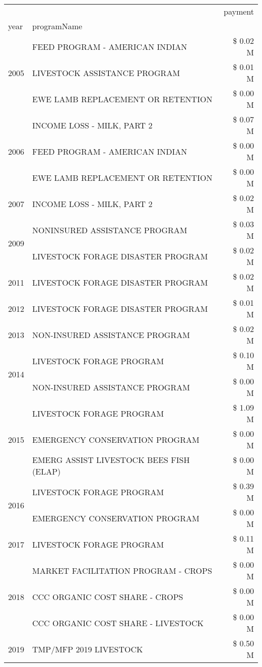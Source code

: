 \begin{tabular}{llr}
\toprule
 &  & payment \\
year & programName &  \\
\midrule
\multirow[t]{3}{*}{2005} & FEED PROGRAM - AMERICAN INDIAN & \$ 0.02 M \\
 & LIVESTOCK ASSISTANCE PROGRAM & \$ 0.01 M \\
 & EWE LAMB REPLACEMENT OR RETENTION & \$ 0.00 M \\
\cline{1-3}
\multirow[t]{3}{*}{2006} & INCOME LOSS - MILK, PART 2 & \$ 0.07 M \\
 & FEED PROGRAM - AMERICAN INDIAN & \$ 0.00 M \\
 & EWE LAMB REPLACEMENT OR RETENTION & \$ 0.00 M \\
\cline{1-3}
2007 & INCOME LOSS - MILK, PART 2 & \$ 0.02 M \\
\cline{1-3}
\multirow[t]{2}{*}{2009} & NONINSURED ASSISTANCE PROGRAM & \$ 0.03 M \\
 & LIVESTOCK FORAGE DISASTER  PROGRAM & \$ 0.02 M \\
\cline{1-3}
2011 & LIVESTOCK FORAGE DISASTER PROGRAM & \$ 0.02 M \\
\cline{1-3}
2012 & LIVESTOCK FORAGE DISASTER PROGRAM & \$ 0.01 M \\
\cline{1-3}
2013 & NON-INSURED ASSISTANCE PROGRAM & \$ 0.02 M \\
\cline{1-3}
\multirow[t]{2}{*}{2014} & LIVESTOCK FORAGE PROGRAM & \$ 0.10 M \\
 & NON-INSURED ASSISTANCE PROGRAM & \$ 0.00 M \\
\cline{1-3}
\multirow[t]{3}{*}{2015} & LIVESTOCK FORAGE PROGRAM & \$ 1.09 M \\
 & EMERGENCY CONSERVATION PROGRAM & \$ 0.00 M \\
 & EMERG ASSIST LIVESTOCK BEES FISH (ELAP) & \$ 0.00 M \\
\cline{1-3}
\multirow[t]{2}{*}{2016} & LIVESTOCK FORAGE PROGRAM & \$ 0.39 M \\
 & EMERGENCY CONSERVATION PROGRAM & \$ 0.00 M \\
\cline{1-3}
2017 & LIVESTOCK FORAGE PROGRAM & \$ 0.11 M \\
\cline{1-3}
\multirow[t]{3}{*}{2018} & MARKET FACILITATION PROGRAM - CROPS & \$ 0.00 M \\
 & CCC ORGANIC COST SHARE - CROPS & \$ 0.00 M \\
 & CCC ORGANIC COST SHARE - LIVESTOCK & \$ 0.00 M \\
\cline{1-3}
\multirow[t]{3}{*}{2019} & TMP/MFP 2019 LIVESTOCK & \$ 0.50 M \\

\end{tabular}
